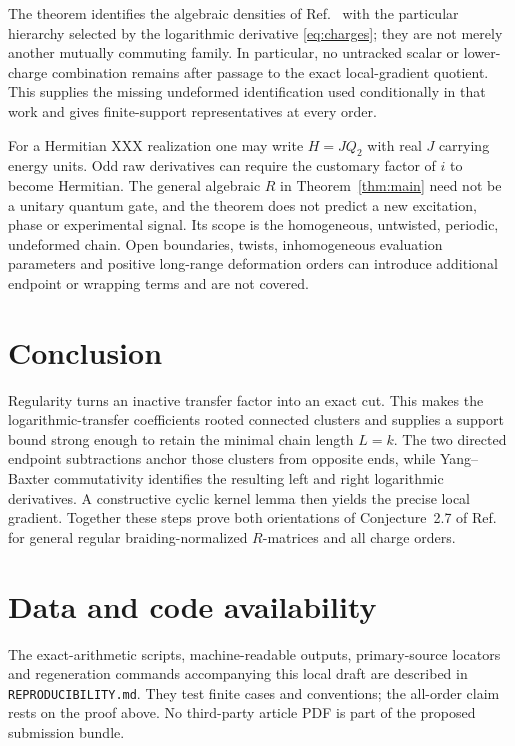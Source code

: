 \documentclass[11pt,a4paper]{article}
\theoremstyle{definition}
\theoremstyle{remark}
\begin{document}
The theorem identifies the algebraic densities of Ref.~\cite{SchoutenDeLeeuw2026}
with the particular hierarchy selected by the logarithmic derivative
\eqref{eq:charges}; they are not merely another mutually commuting family.  In
particular, no untracked scalar or lower-charge combination remains after passage to the
exact local-gradient quotient.  This supplies the missing undeformed identification
used conditionally in that work and gives finite-support representatives at every order.

For a Hermitian XXX realization one may write $H=JQ_2$ with real $J$ carrying energy
units.  Odd raw derivatives can require the customary factor of $i$ to become Hermitian.
The general algebraic $R$ in Theorem~\ref{thm:main} need not be a unitary quantum gate,
and the theorem does not predict a new excitation, phase or experimental signal.  Its
scope is the homogeneous, untwisted, periodic, undeformed chain.  Open boundaries,
twists, inhomogeneous evaluation parameters and positive long-range deformation orders
can introduce additional endpoint or wrapping terms and are not covered.

\section{Conclusion}

Regularity turns an inactive transfer factor into an exact cut.  This makes the
logarithmic-transfer coefficients rooted connected clusters and supplies a support bound
strong enough to retain the minimal chain length $L=k$.  The two directed endpoint
subtractions anchor those clusters from opposite ends, while Yang--Baxter commutativity
identifies the resulting left and right logarithmic derivatives.  A constructive cyclic
kernel lemma then yields the precise local gradient.  Together these steps prove both
orientations of Conjecture~2.7 of Ref.~\cite{SchoutenDeLeeuw2026} for general regular
braiding-normalized $R$-matrices and all charge orders.

\section*{Data and code availability}

The exact-arithmetic scripts, machine-readable outputs, primary-source locators and
regeneration commands accompanying this local draft are described in
\texttt{REPRODUCIBILITY.md}.  They test finite cases and conventions; the all-order
claim rests on the proof above.  No third-party article PDF is part of the proposed
submission bundle.
\end{document}
